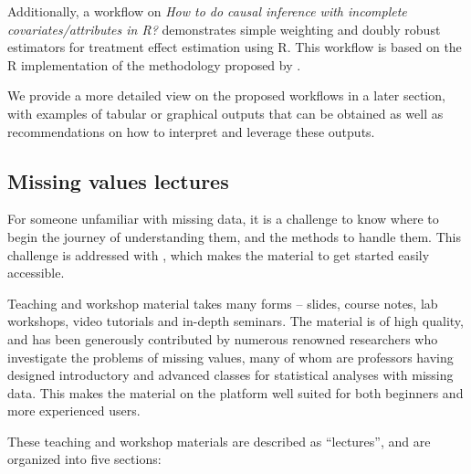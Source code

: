 Additionally, a workflow on \textit{How to do causal inference with incomplete covariates/attributes in R?} demonstrates simple weighting and doubly robust estimators for treatment effect estimation using R. This workflow is based on the R implementation of the methodology proposed by \citet{Mayer2020}.

We provide a more detailed view on the proposed workflows in a later section, with examples of tabular or graphical outputs that can be obtained as well as recommendations on how to interpret and leverage these outputs.


\subsection{Missing values lectures}\label{sec:lectures}


For someone unfamiliar with missing data, it is a challenge to know where to begin the journey of understanding them, and the methods to handle them.
This challenge is addressed with , which makes the material to get started easily accessible.

Teaching and workshop material takes many forms -- slides, course notes, lab workshops, video tutorials and in-depth seminars. The material is of high quality, and has been generously contributed by numerous renowned researchers who investigate the problems of missing values, many of whom are professors having designed introductory and advanced classes for statistical analyses with missing data. This makes the material on the  platform well suited for both beginners and more experienced users.

These teaching and workshop materials are described as ``lectures'', and are organized into five sections:

